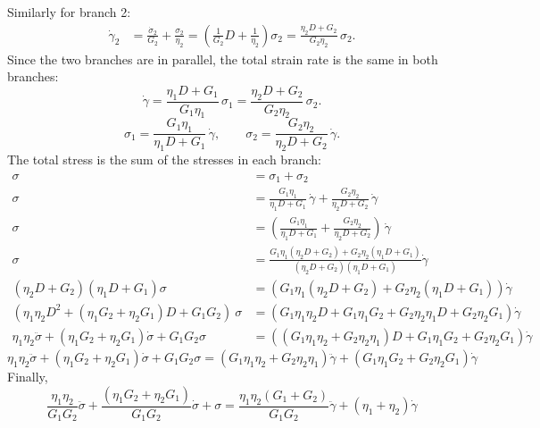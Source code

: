 \documentclass[12pt, a4paper]{article}
\numberwithin{equation}{section}
\begin{document}
Similarly for branch 2:
\begin{align*}
	\dot\gamma_2 &= \frac{\dot\sigma_2}{G_2} + \frac{\sigma_2}{\eta_2}
	= \left(\frac{1}{G_2}D + \frac{1}{\eta_2}\right)\sigma_2
	= \frac{\eta_2 D + G_2}{G_2\eta_2}\,\sigma_2.
\end{align*}
Since the two branches are in parallel, the total strain rate is the same in both branches:
\[
	\dot\gamma 
	= \frac{\eta_1 D + G_1}{G_1\eta_1}\,\sigma_1
	= \frac{\eta_2 D + G_2}{G_2\eta_2}\,\sigma_2.
\]
\[
	\sigma_1 = \frac{G_1\eta_1}{\eta_1 D + G_1}\,\dot\gamma,
	\qquad
	\sigma_2 = \frac{G_2\eta_2}{\eta_2 D + G_2}\,\dot\gamma.
\]
The total stress is the sum of the stresses in each branch:
\begin{align*}
	\sigma &= \sigma_1 + \sigma_2 \\
	\sigma &= \frac{G_1\eta_1}{\eta_1 D + G_1}\,\dot\gamma
	+ \frac{G_2\eta_2}{\eta_2 D + G_2}\,\dot\gamma \\
	\sigma &= \left(\frac{G_1\eta_1}{\eta_1 D + G_1}
	+ \frac{G_2\eta_2}{\eta_2 D + G_2} \right)\,\dot\gamma
	\\
	\sigma &= 
		\frac{G_1\eta_1(\eta_2 D + G_2)
	    + G_2\eta_2(\eta_1 D + G_1)} 
	    {(\eta_2 D + G_2)(\eta_1 D + G_1)} 
		\dot\gamma
	\\
	(\eta_2 D + G_2)(\eta_1 D + G_1) \sigma
		&= (G_1\eta_1(\eta_2 D + G_2)
	    + G_2\eta_2(\eta_1 D + G_1))
		\dot\gamma
	\\
	(\eta_1\eta_2 D^2
	+ (\eta_1 G_2 + \eta_2 G_1) D
	+ G_1 G_2)
	\ \sigma
		&= (G_1\eta_1\eta_2 D + G_1\eta_1G_2
	    + G_2\eta_2\eta_1 D + G_2\eta_2G_1)
		\dot\gamma
	\\
	\eta_1\eta_2 \ddot\sigma
	+ (\eta_1 G_2 + \eta_2 G_1) \dot\sigma
	+ G_1 G_2\sigma
		&= ((G_1\eta_1\eta_2 + G_2\eta_2\eta_1) D
	    + G_1\eta_1G_2 + G_2\eta_2G_1)
		\dot\gamma
\end{align*}
\begin{equation*}
	\eta_1\eta_2 \ddot\sigma
	+ (\eta_1 G_2 + \eta_2 G_1) \dot\sigma
	+ G_1 G_2\sigma
		= (G_1\eta_1\eta_2 + G_2\eta_2\eta_1) \ddot\gamma
	    + (G_1\eta_1G_2 + G_2\eta_2G_1)\dot\gamma	
\end{equation*}
Finally,
\begin{equation}
	\frac{\eta_1\eta_2}{G_1G_2} \ddot\sigma
	+ \frac{(\eta_1 G_2 + \eta_2 G_1)}{G_1G_2} \dot\sigma
	+ \sigma
		= \frac{\eta_1\eta_2(G_1 + G_2)}{G_1G_2} \ddot\gamma
	    + (\eta_1 + \eta_2)\dot\gamma	
		\label{eq:two_maxwell_parallel_soln}
\end{equation}
\end{document}
